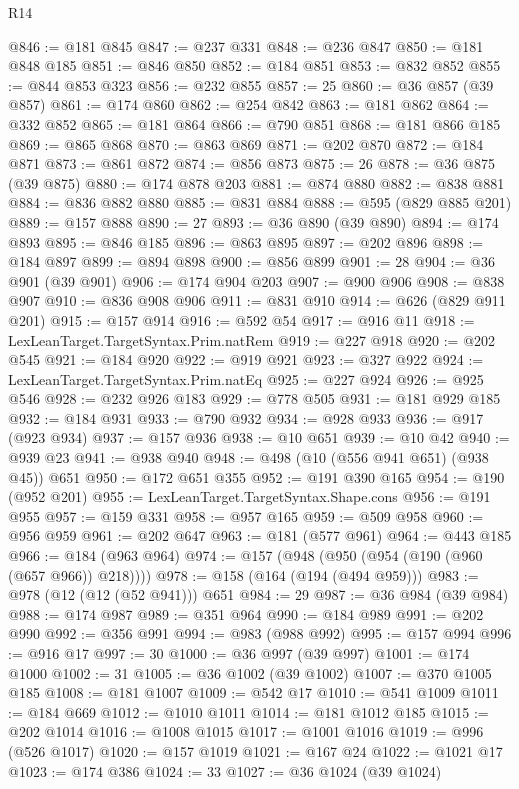 \begin{lexlean}{R14}
\begin{coremodule}
@846 := @181 @845
@847 := @237 @331
@848 := @236 @847
@850 := @181 @848 @185
@851 := @846 @850
@852 := @184 @851
@853 := @832 @852
@855 := @844 @853 @323
@856 := @232 @855
@857 := 25
@860 := @36 @857 (@39 @857)
@861 := @174 @860
@862 := @254 @842
@863 := @181 @862
@864 := @332 @852
@865 := @181 @864
@866 := @790 @851
@868 := @181 @866 @185
@869 := @865 @868
@870 := @863 @869
@871 := @202 @870
@872 := @184 @871
@873 := @861 @872
@874 := @856 @873
@875 := 26
@878 := @36 @875 (@39 @875)
@880 := @174 @878 @203
@881 := @874 @880
@882 := @838 @881
@884 := @836 @882 @880
@885 := @831 @884
@888 := @595 (@829 @885 @201)
@889 := @157 @888
@890 := 27
@893 := @36 @890 (@39 @890)
@894 := @174 @893
@895 := @846 @185
@896 := @863 @895
@897 := @202 @896
@898 := @184 @897
@899 := @894 @898
@900 := @856 @899
@901 := 28
@904 := @36 @901 (@39 @901)
@906 := @174 @904 @203
@907 := @900 @906
@908 := @838 @907
@910 := @836 @908 @906
@911 := @831 @910
@914 := @626 (@829 @911 @201)
@915 := @157 @914
@916 := @592 @54
@917 := @916 @11
@918 := LexLeanTarget.TargetSyntax.Prim.natRem
@919 := @227 @918
@920 := @202 @545
@921 := @184 @920
@922 := @919 @921
@923 := @327 @922
@924 := LexLeanTarget.TargetSyntax.Prim.natEq
@925 := @227 @924
@926 := @925 @546
@928 := @232 @926 @183
@929 := @778 @505
@931 := @181 @929 @185
@932 := @184 @931
@933 := @790 @932
@934 := @928 @933
@936 := @917 (@923 @934)
@937 := @157 @936
@938 := @10 @651
@939 := @10 @42
@940 := @939 @23
@941 := @938 @940
@948 := @498 (@10 (@556 @941 @651) (@938 @45)) @651
@950 := @172 @651 @355
@952 := @191 @390 @165
@954 := @190 (@952 @201)
@955 := LexLeanTarget.TargetSyntax.Shape.cons
@956 := @191 @955
@957 := @159 @331
@958 := @957 @165
@959 := @509 @958
@960 := @956 @959
@961 := @202 @647
@963 := @181 (@577 @961)
@964 := @443 @185
@966 := @184 (@963 @964)
@974 := @157 (@948 (@950 (@954 (@190 (@960 (@657 @966)) @218))))
@978 := @158 (@164 (@194 (@494 @959)))
@983 := @978 (@12 (@12 (@52 @941))) @651
@984 := 29
@987 := @36 @984 (@39 @984)
@988 := @174 @987
@989 := @351 @964
@990 := @184 @989
@991 := @202 @990
@992 := @356 @991
@994 := @983 (@988 @992)
@995 := @157 @994
@996 := @916 @17
@997 := 30
@1000 := @36 @997 (@39 @997)
@1001 := @174 @1000
@1002 := 31
@1005 := @36 @1002 (@39 @1002)
@1007 := @370 @1005 @185
@1008 := @181 @1007
@1009 := @542 @17
@1010 := @541 @1009
@1011 := @184 @669
@1012 := @1010 @1011
@1014 := @181 @1012 @185
@1015 := @202 @1014
@1016 := @1008 @1015
@1017 := @1001 @1016
@1019 := @996 (@526 @1017)
@1020 := @157 @1019
@1021 := @167 @24
@1022 := @1021 @17
@1023 := @174 @386
@1024 := 33
@1027 := @36 @1024 (@39 @1024)

\end{coremodule}
\end{lexlean}
